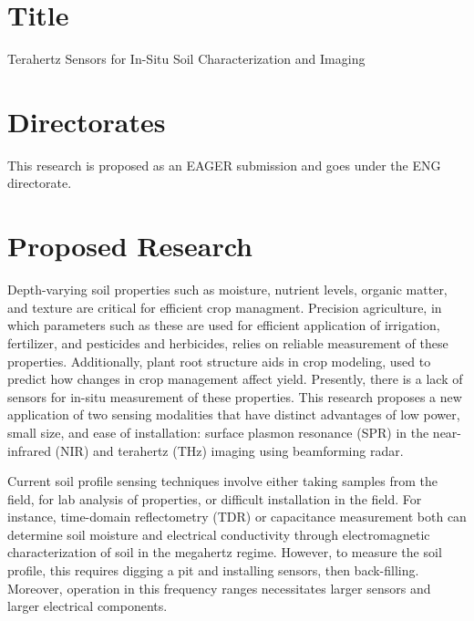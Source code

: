 \documentclass[11pt,letterpaper]{article}
\begin{document}
\section{Title}
Terahertz Sensors for In-Situ Soil Characterization and Imaging
\section{Directorates}
This research is proposed as an EAGER submission and goes under the ENG directorate.
\section{Proposed Research}

Depth-varying soil properties such as moisture, nutrient levels, organic matter, and texture are critical for efficient crop managment. Precision agriculture, in which parameters such as these are used for efficient application of irrigation, fertilizer, and pesticides and herbicides, relies on reliable measurement of these properties.  Additionally, plant root structure aids in crop modeling, used to predict how changes in crop management affect yield. Presently, there is a lack of sensors for in-situ measurement of these properties. This research proposes a new application of two sensing modalities that have distinct advantages of low power, small size, and ease of installation: surface plasmon resonance (SPR) in the near-infrared (NIR) and terahertz (THz) imaging using beamforming radar.

Current soil profile sensing techniques involve either taking samples from the field, for lab analysis of properties, or difficult installation in the field. For instance, time-domain reflectometry (TDR) \cite{topp1980electromagnetic} or capacitance measurement \cite{birchak1974high} both can determine soil moisture and electrical conductivity through electromagnetic characterization of soil in the megahertz regime. However, to measure the soil profile, this requires digging a pit and installing sensors, then back-filling. Moreover, operation in this frequency ranges necessitates larger sensors and larger electrical components.
\end{document}
